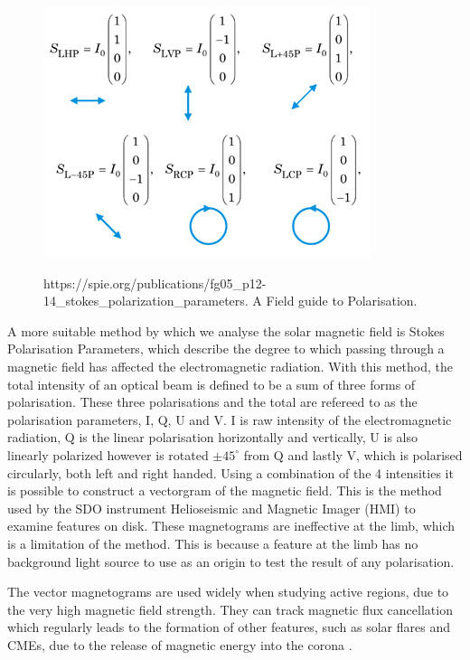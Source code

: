\begin{figure}
	\includegraphics{Chapter1/Figs/stokes_params}
	\label{stokes}
	\caption{https://spie.org/publications/fg05_p12-14_stokes_polarization_parameters. A Field guide to Polarisation.}
\end{figure}

A more suitable method by which we analyse the solar magnetic field is Stokes Polarisation Parameters, which describe the degree to which passing through a magnetic field has affected the electromagnetic radiation.
With this method, the total intensity of an optical beam is defined to be a sum of three forms of polarisation.
These three polarisations and the total are refereed to as the polarisation parameters, I, Q, U and V.
I is raw intensity of the electromagnetic radiation, Q is the linear polarisation horizontally and vertically, U is also linearly polarized however is rotated $\pm45^\circ$ from Q and lastly V, which is polarised circularly, both left and right handed.
Using a combination of the 4 intensities it is possible to construct a vectorgram of the magnetic field.
This is the method used by the SDO instrument Helioseismic and Magnetic Imager (HMI) to examine features on disk.
These magnetograms are ineffective at the limb, which is a limitation of the method.
This is because a feature at the limb has no background light source to use as an origin to test the result of any polarisation. 

The vector magnetograms are used widely when studying active regions, due to the very high magnetic field strength.
They can track magnetic flux cancellation which regularly leads to the formation of other features, such as solar flares and CMEs, due to the release of magnetic energy into the corona \cite{Welsch2006}.

